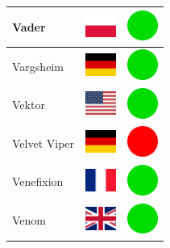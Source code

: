 \documentclass[12pt, a4paper, twoside]{report}
\begin{document}
\begin{center}
\begin{longtable}{|p{5cm}|p{2cm}|p{2cm}|}
Vader & \includegraphics[width=1cm]{4x3/pl} & \includegraphics[width=1cm]{likes/y} \\ \hline
Vargsheim & \includegraphics[width=1cm]{4x3/de} & \includegraphics[width=1cm]{likes/y} \\ \hline
Vektor & \includegraphics[width=1cm]{4x3/us} & \includegraphics[width=1cm]{likes/y} \\ \hline
Velvet Viper & \includegraphics[width=1cm]{4x3/de} & \includegraphics[width=1cm]{likes/n} \\ \hline
Venefixion & \includegraphics[width=1cm]{4x3/fr} & \includegraphics[width=1cm]{likes/y} \\ \hline
Venom & \includegraphics[width=1cm]{4x3/gb} & \includegraphics[width=1cm]{likes/y} \\ \hline

\end{longtable}
\end{center}
\end{document}

